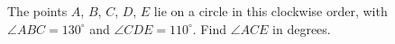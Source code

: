 The points $A$, $B$, $C$, $D$, $E$ lie on a circle in this clockwise order, with $\angle ABC=130^\circ$ and $\angle CDE=110^\circ$. Find $\angle ACE$ in degrees.
